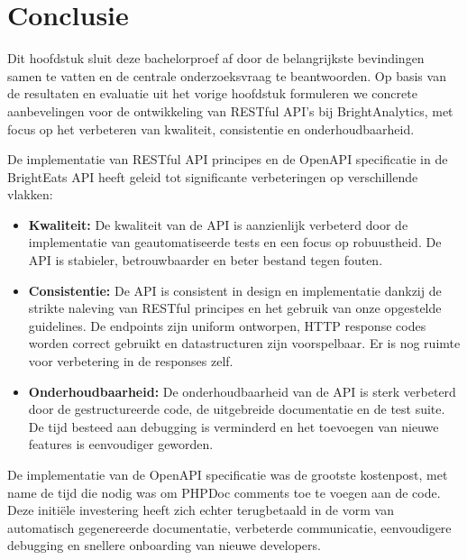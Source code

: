 
\chapter{Conclusie}%
\label{ch:conclusie}

Dit hoofdstuk sluit deze bachelorproef af door de belangrijkste bevindingen samen te vatten en de centrale onderzoeksvraag te beantwoorden. Op basis van de resultaten en evaluatie uit het vorige hoofdstuk formuleren we concrete aanbevelingen voor de ontwikkeling van RESTful API's bij BrightAnalytics, met focus op het verbeteren van kwaliteit, consistentie en onderhoudbaarheid.

\bigskip

De implementatie van RESTful API principes en de OpenAPI specificatie in de BrightEats API heeft geleid tot significante verbeteringen op verschillende vlakken:

\begin{itemize}
  \item \textbf{Kwaliteit:} De kwaliteit van de API is aanzienlijk verbeterd door de implementatie van geautomatiseerde tests en een focus op robuustheid. De API is stabieler, betrouwbaarder en beter bestand tegen fouten.
  \item \textbf{Consistentie:} De API is consistent in design en implementatie dankzij de strikte naleving van RESTful principes en het gebruik van onze opgestelde guidelines. De endpoints zijn uniform ontworpen, HTTP response codes worden correct gebruikt en datastructuren zijn voorspelbaar. Er is nog ruimte voor verbetering in de responses zelf.
  \item \textbf{Onderhoudbaarheid:} De onderhoudbaarheid van de API is sterk verbeterd door de gestructureerde code, de uitgebreide documentatie en de test suite. De tijd besteed aan debugging is verminderd en het toevoegen van nieuwe features is eenvoudiger geworden.
\end{itemize}

De implementatie van de OpenAPI specificatie was de grootste kostenpost, met name de tijd die nodig was om PHPDoc comments toe te voegen aan de code. Deze initiële investering heeft zich echter terugbetaald in de vorm van automatisch gegenereerde documentatie, verbeterde communicatie, eenvoudigere debugging en snellere onboarding van nieuwe developers.

